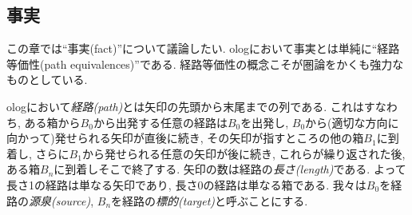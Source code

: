 
\subsection{事実}\label{sec:facts}


この章では``事実(fact)''について議論したい. ologにおいて事実とは単純に``経路等価性(path equivalences)''である. 経路等価性の概念こそが圏論をかくも強力なものとしている.


ologにおいて\emph{経路(path)}とは矢印の先頭から末尾までの列である. これはすなわち, ある箱から$B_0$から出発する任意の経路は$B_0$を出発し, $B_0$から(適切な方向に向かって)発せられる矢印が直後に続き, その矢印が指すところの他の箱$B_1$に到着し, さらに$B_1$から発せられる任意の矢印が後に続き, これらが繰り返された後, ある箱$B_n$に到着しそこで終了する. 矢印の数は経路の\emph{長さ(length)}である. よって長さ1の経路は単なる矢印であり, 長さ0の経路は単なる箱である. 我々は$B_0$を経路の\emph{源泉(source)}, $B_n$を経路の\emph{標的(target)}と呼ぶことにする.


